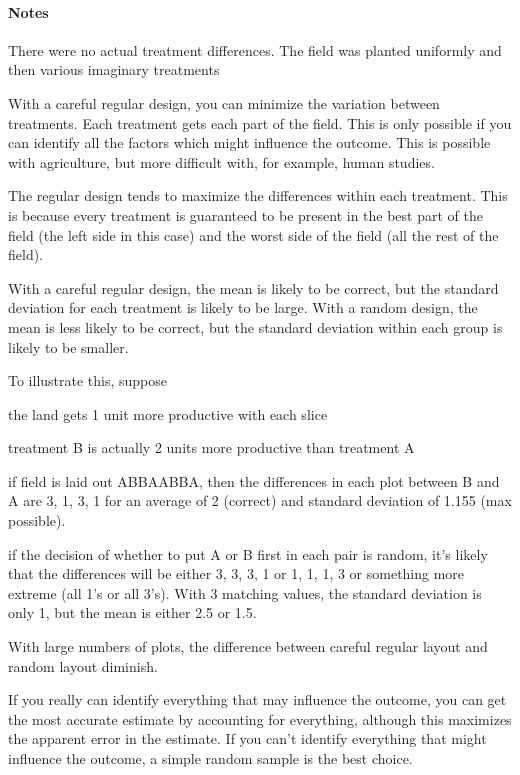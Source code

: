 \documentclass[landscape]{article}
\begin{document}
\begin{note}
  \paragraph{Notes}
  There were no actual treatment differences. The field was planted uniformly
  and then various imaginary treatments

  With a careful regular design, you can minimize the variation between
  treatments. Each treatment gets each part of the field. This is only possible
  if you can identify all the factors which might influence the outcome. This is
  possible with agriculture, but more difficult with, for example, human
  studies.

  The regular design tends to maximize the differences within each treatment.
  This is because every treatment is guaranteed to be present in the best part
  of the field (the left side in this case) and the worst side of the field (all
  the rest of the field). 

  With a careful regular design, the mean is likely to be correct, but the
  standard deviation for each treatment is likely to be large. With a random
  design, the mean is less likely to be correct, but the standard deviation
  within each group is likely to be smaller.

  To illustrate this, suppose 
  \begin{itemize*}
    \item the land gets 1 unit more productive with each slice
    \item treatment B is actually 2 units more productive than treatment A
    \item if field is laid out ABBAABBA, then the differences in each plot
      between B and A are 3, 1, 3, 1 for an average of 2 (correct) and standard
      deviation of 1.155 (max possible).
    \item if the decision of whether to put A or B first in each pair is random,
      it's likely that the differences will be either 3, 3, 3, 1 or 1, 1, 1, 3
      or something more extreme (all 1's or all 3's). With 3 matching values,
      the standard deviation is only 1, but the mean is either 2.5 or 1.5.
  \end{itemize*}

  With large numbers of plots, the difference between careful regular layout and
  random layout diminish.

  If you really can identify everything that may influence the outcome, you can
  get the most accurate estimate by accounting for everything, although this
  maximizes the apparent error in the estimate. If you can't identify everything
  that might influence the outcome, a simple random sample is the best choice.

\end{note}
\end{document}
